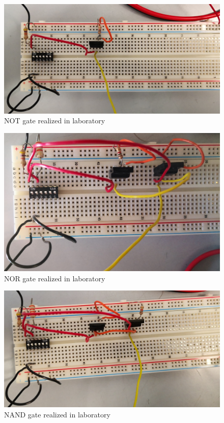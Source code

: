 \documentclass{article}
\begin{document}
\begin{figure}[h]
  \centering
  \includegraphics[scale=.08]{IM_NOT_LAB.jpg}
  \caption{NOT gate realized in laboratory}
  \label{NOT_LAB}
\end{figure}

\begin{figure}[h]
  \centering
  \includegraphics[scale=.08]{IM_NOR_LAB.jpg}
  \caption{NOR gate realized in laboratory}
  \label{NOR_LAB}
\end{figure}

\begin{figure}[h]
  \centering
  \includegraphics[scale=.08]{IM_NAND_LAB.jpg}
  \caption{NAND gate realized in laboratory}
  \label{NAND_LAB}
\end{figure}
\end{document}
